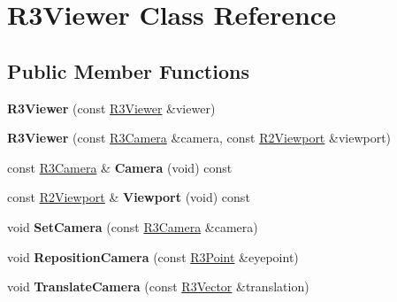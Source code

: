 \hypertarget{class_r3_viewer}{}\section{R3\+Viewer Class Reference}
\label{class_r3_viewer}
\subsection*{Public Member Functions}
\begin{DoxyCompactItemize}
\item 
{\bfseries R3\+Viewer} (const \hyperlink{class_r3_viewer}{R3\+Viewer} \&viewer)\hypertarget{class_r3_viewer_a9a68afa1493b2eb0aba9673091b63fb0}{}\label{class_r3_viewer_a9a68afa1493b2eb0aba9673091b63fb0}

\item 
{\bfseries R3\+Viewer} (const \hyperlink{class_r3_camera}{R3\+Camera} \&camera, const \hyperlink{class_r2_viewport}{R2\+Viewport} \&viewport)\hypertarget{class_r3_viewer_a1333861dada183b7c643737ea67c5111}{}\label{class_r3_viewer_a1333861dada183b7c643737ea67c5111}

\item 
const \hyperlink{class_r3_camera}{R3\+Camera} \& {\bfseries Camera} (void) const \hypertarget{class_r3_viewer_a2c3d6e2dd8a0da33fc07a20c2595ae48}{}\label{class_r3_viewer_a2c3d6e2dd8a0da33fc07a20c2595ae48}

\item 
const \hyperlink{class_r2_viewport}{R2\+Viewport} \& {\bfseries Viewport} (void) const \hypertarget{class_r3_viewer_a3244b5a633d6595c05cd33f1bce0b58e}{}\label{class_r3_viewer_a3244b5a633d6595c05cd33f1bce0b58e}

\item 
void {\bfseries Set\+Camera} (const \hyperlink{class_r3_camera}{R3\+Camera} \&camera)\hypertarget{class_r3_viewer_ad3067920affe37f82f7e8cddf79ca13f}{}\label{class_r3_viewer_ad3067920affe37f82f7e8cddf79ca13f}

\item 
void {\bfseries Reposition\+Camera} (const \hyperlink{class_r3_point}{R3\+Point} \&eyepoint)\hypertarget{class_r3_viewer_a4675ce3f3d1847647ce309d98794b4e0}{}\label{class_r3_viewer_a4675ce3f3d1847647ce309d98794b4e0}

\item 
void {\bfseries Translate\+Camera} (const \hyperlink{class_r3_vector}{R3\+Vector} \&translation)\hypertarget{class_r3_viewer_a03051df4220c08c27738387b12a7e25d}{}\label{class_r3_viewer_a03051df4220c08c27738387b12a7e25d}


\end{DoxyCompactItemize}
